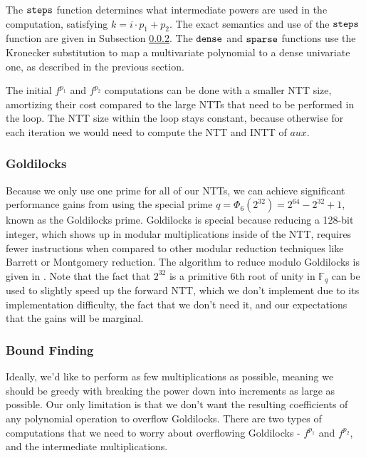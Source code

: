 The $\textnormal{\texttt{steps}}$ function determines what intermediate powers 
are used in the computation, satisfying $k = i \cdot p_1 + p_2$.
The exact semantics and use of the $\textnormal{\texttt{steps}}$ function are 
given in Subsection \ref{subsec:poly:bounds}. The $\textnormal{\texttt{dense}}$ and
$\textnormal{\texttt{sparse}}$ functions use the Kronecker substitution to map a 
multivariate polynomial to a dense univariate one, as described 
in the previous section.

The initial $f^{p_1}$ and $f^{p_2}$ computations can be done with 
a smaller NTT size, amortizing their cost compared to the large 
NTTs that need to be performed in the loop. The NTT size within the 
loop stays constant, because otherwise for each iteration we would 
need to compute the NTT and INTT of $aux$.

\subsubsection{Goldilocks}

Because we only use one prime for all of our NTTs, we can achieve 
significant performance gains from using the special prime 
$q = \Phi_6(2^{32}) = 2^{64} - 2^{32} + 1$, known as the Goldilocks 
prime. Goldilocks is special because reducing a 128-bit integer, 
which shows up in modular multiplications inside of the NTT, requires 
fewer instructions when compared to other modular reduction 
techniques like Barrett or Montgomery reduction. The algorithm to 
reduce modulo Goldilocks is given in \cite{ozcan-2023-fft}. 
Note that 
the fact that $2^{32}$ is a primitive 6th root of unity in $\mathbb{F}_q$ 
can be used to slightly speed up the forward NTT, which we don't 
implement due to its implementation difficulty, the fact that we don't need it, and 
our expectations that the gains will be marginal.

\subsubsection{Bound Finding}
\label{subsec:poly:bounds}

Ideally, we'd like to perform as few multiplications as possible, 
meaning we should be greedy with breaking the power down into 
increments as large as possible. Our only limitation is that we don't 
want the resulting coefficients of any polynomial operation to 
overflow Goldilocks. There are two types of computations that we need to 
worry about overflowing Goldilocks - $f^{p_1}$ and $f^{p_2}$, and the 
intermediate multiplications.

